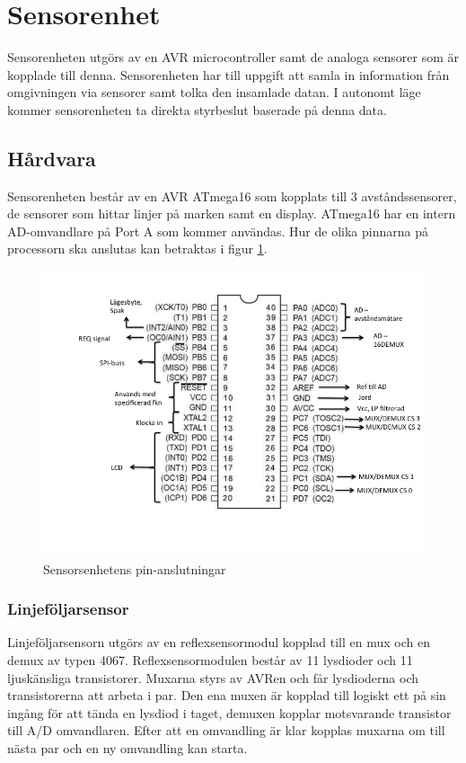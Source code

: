 \section{Sensorenhet}
Sensorenheten utgörs av en AVR microcontroller samt de analoga sensorer som är kopplade till denna. Sensorenheten har till uppgift att samla in information från omgivningen via sensorer samt tolka den insamlade datan. I autonomt läge kommer sensorenheten ta direkta styrbeslut baserade på denna data. 

\subsection{Hårdvara}
Sensorenheten består av en AVR ATmega16 som kopplats till 3 avståndssensorer, de sensorer som hittar linjer på marken samt en display. ATmega16 har en intern AD-omvandlare på Port A som kommer användas. Hur de olika pinnarna på processorn ska anslutas kan betraktas i figur 
\ref{fig:PINsensor}.

\begin{figure}[H]
  \centering
 \includegraphics[angle=0,scale=0.5]{bilder/PIN_sensor.jpg}
  \caption{Sensorsenhetens pin-anslutningar}
  \label{fig:PINsensor}
\end{figure}

\subsubsection{Linjeföljarsensor}
Linjeföljarsensorn utgörs av en reflexsensormodul kopplad till en mux och en demux av typen 4067. Reflexsensormodulen består av 11 lysdioder och 11 ljuskänsliga transistorer. Muxarna styrs av AVRen och får lysdioderna och transistorerna att arbeta i par. Den ena muxen är kopplad till logiskt ett på sin ingång för att tända en lysdiod i taget, demuxen kopplar motsvarande transistor till A/D omvandlaren. Efter att en omvandling är klar kopplas muxarna om till nästa par och en ny omvandling kan starta.

